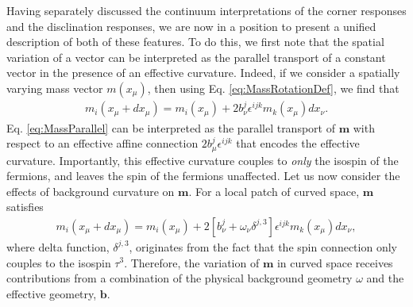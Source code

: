 \documentclass[%
 reprint,
 amsmath,amssymb,
 aps,
]{revtex4-1}
\begin{document}
Having separately discussed the continuum interpretations of the corner responses and the disclination responses, we are now in a position to present a unified description of both of these features. To do this, we first note that the spatial variation of a vector can be interpreted as the parallel transport of a constant vector  in the presence of an effective curvature. Indeed, if we consider a spatially varying mass vector $m(x_\mu)$, then using Eq. \ref{eq:MassRotationDef}, we find that
\begin{equation}\begin{split}
m_i(x_\mu+dx_\mu) = m_i(x_\mu)+ 2b^j_\nu \epsilon^{ijk} m_k(x_\mu) dx_\nu.  
\label{eq:MassParallel}\end{split}\end{equation}
Eq. \ref{eq:MassParallel} can be interpreted as the parallel transport of $\bm{m}$ with respect to an effective affine connection $2b^j_\mu \epsilon^{ijk}$ that encodes the effective curvature.  Importantly, this effective curvature couples to \textit{only} the isospin of the fermions, and leaves the spin of the fermions unaffected.  Let us now consider the effects of background curvature on $\bm{m}$. For a local patch of curved space, $\bm{m}$ satisfies
\begin{equation}\begin{split}
m_i(x_\mu+dx_\mu) = m_i(x_\mu)+ 2[b^j_\nu + \omega_\nu \delta^{j,3}] \epsilon^{ijk} m_k(x_\mu)dx_\nu,  
\label{eq:MassParallel2}\end{split}\end{equation}
where delta function, $\delta^{j,3}$, originates from the fact that the spin connection only couples to the isospin $\tau^3$. Therefore, the variation of $\bm{m}$ in curved space receives contributions from a combination of the physical background geometry $\omega$ and the effective geometry, $\bm{b}$.
\end{document}
